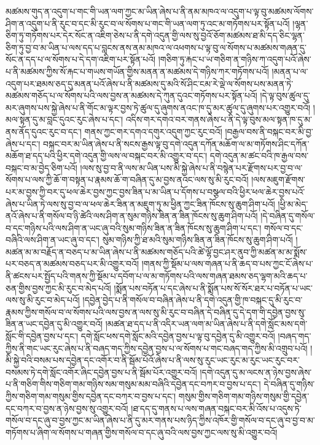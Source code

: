མཚམས་གུད་ན་འདུག་པ་གང་གི་ཡན་ལག་ཀྱང་མ་ཡིན་ཞེས་པ་ནི་ནམ་མཁའ་ལ་འདུག་པ་ལྟ་བུ་མཚམས་ལོགས་ཤིག་ན་འདུག་པ་ནི་རུང་བ་དང་མི་རུང་བ་ལ་སོགས་པ་གང་གི་ཡན་ལག་ཏུ་འང་མ་གཏོགས་པར་སྟོན་པའོ། །ལྷན་ཅིག་ཏུ་གཏོགས་པར་དེར་སོང་ན་འཇིག་ཅེས་པ་ནི་དགེ་འདུན་གྱི་ལས་སུ་བྱའོ་ཅོག་མཚམས་ཐ་མི་དད་ཅིང་ལྷན་ཅིག་ཏུ་བྱ་བ་མ་ཡིན་པ་ལས་དད་པ་བླངས་ནས་ནམ་མཁའ་ལ་འཕགས་པ་ལྟ་བུ་ལ་སོགས་པ་མཚམས་གཞན་དུ་སོང་ན་དད་པ་ལ་སོགས་པ་དེ་དག་འཇིག་པར་སྟོན་པའོ། །གཅིག་ཏུ་རྐང་པ་ཡ་གཅིག་ན་གཉིས་ཀ་འདུག་པའོ་ཞེས་པ་ནི་མཚམས་ཀྱིས་སོ་རྐང་པ་གཡས་གཡོན་གྱིས་མནན་ན་མཚམས་དེ་གཉིས་ཀར་གཏོགས་པའོ། །མནན་པ་ལ་འདུག་པར་ཐམས་ཅད་དུ་མནན་པའོ་ཞེས་པ་ནི་མཚམས་དུ་མའི་སོ་ཤིང་ངམ་རེ་ལྡེ་ལ་སོགས་པས་མནན་ཏེ་མཚམས་གཅོད་པ་ལ་སོགས་པའི་ལས་བྱས་ན་མཚམས་དེ་ཀུན་དུའང་གཏོགས་པར་སྟོན་པའོ། །དེ་ལྟ་བུས་ཚུལ་དུ་མར་ཞུགས་པས་སྐྱེ་ཞེས་པ་ནི་གོང་མ་ལྟར་བྱས་ཏེ་ཚུལ་དུ་ཞུགས་ནའང་ཁ་དུ་མར་ཚུལ་དུ་ཞུགས་པར་འགྱུར་བའོ། །མལ་སྟན་དུ་མ་བླང་དུའང་རུང་ཞེས་པ་དང་། འདིས་གར་དགའ་བར་གནས་ཞེས་པ་ནི་དེ་ལྟ་བུས་མལ་སྟན་ཁ་དུ་མ་ནས་ནོད་དུའང་རུང་བ་དང་། གནས་ཀྱང་གར་དགའ་དགུར་འདུག་ཀྱང་རུང་བའོ། །བརྒྱལ་བས་ནི་བསྐང་བར་མི་བྱ་ཞེས་པ་དང་། བསྐང་བར་མ་ཡིན་ཞེས་པ་ནི་སངས་རྒྱས་ལྟ་བུ་དགེ་འདུན་དཀོན་མཆོག་ལ་མ་གཏོགས་ཤིང་དཀོན་མཆོག་ཐ་དད་པའི་ཕྱིར་དགེ་འདུན་གྱི་ལས་ལ་བསྐང་བར་མི་འགྱུར་བ་དང་། དགེ་འདུན་མ་ཚང་བའི་ཁ་རྒྱལ་བས་བསྐང་བ་མ་བྱེད་ཅིག་པའོ། །ལས་སུ་བྱ་བ་ནི་ལས་མ་ཡིན་པས་མི་སྐྱེ་ཞེས་པ་ནི་བསྙེན་པར་རྫོགས་པར་བྱ་བ་ལ་སོགས་པ་ལས་ཀྱི་ཆོ་ག་བསྟན་པ་རྣམས་ཆོ་ག་བཞིན་དུ་མ་བྱས་ནའང་ལས་སུ་མི་རུང་བའོ། །ལས་མཇུག་རྫོགས་པར་མ་བྱས་ཀྱི་བར་དུ་ཕལ་ཆེར་བྱས་ཀྱང་བྱས་ཟིན་པ་མ་ཡིན་པ་དོགས་པ་བསྩལ་བའི་ཕྱིར་ཕལ་ཆེར་བྱས་པའོ་ཞེས་པ་ཡིན་ཏེ་ལས་སུ་བྱ་བ་ལ་ཕལ་ཆེར་ཟིན་ན་མཇུག་ཏུ་མ་ཕྱིན་ཀྱང་ཟིན་ཁོངས་སུ་ཆུག་ཤིག་པའོ། །ཕྱི་མ་མེད་ནའོ་ཞེས་པ་ནི་གསོལ་བ་ཉི་ཚེའི་ལས་ཤིག་ན་སུམ་གཉིས་ཟིན་ན་ཟིན་ཁོངས་སུ་ཆུག་ཤིག་པའོ། །དེ་བཞིན་དུ་གསོལ་བ་དང་གཉིས་པའི་ལས་ཤིག་ན་ཡང་ཞུ་བའི་སུམ་གཉིས་ཟིན་ན་ཟིན་ཁོངས་སུ་ཆུག་ཤིག་པ་དང་། གསོལ་བ་དང་བཞིའི་ལས་ཤིག་ན་ཡང་ཞུ་བ་དང་། སུམ་གཉིས་ཀྱི་ཐ་མའི་སུམ་གཉིས་ཟིན་ན་ཟིན་ཁོངས་སུ་ཆུག་ཤིག་པའོ། །མཚན་མ་མ་བརྗོད་ན་བཅད་པ་མ་ཡིན་ཞེས་པ་ནི་མཚམས་གཅོད་པའི་ཚེ་ལྷོ་བྱང་ཤར་ནུབ་ཀྱི་མཚན་མ་མ་སྨོས་པར་བཅད་ན་མཚམས་བཅད་པར་མི་འགྱུར་བའོ། །གནས་ཀྱི་སྡོམ་པ་ལས་གཞན་པ་ནི་ཆད་བ་པས་ཀྱང་ངོ་ཞེས་པ་ནི་ཚངས་པར་སྤྱོད་པའི་གནས་ཀྱི་སྡོམ་པ་དབོག་པ་ལ་མ་གཏོགས་པའི་ལས་གཞན་ཐམས་ཅད་ལྷག་མའི་ཆད་པ་ཅན་གྱིས་བྱས་ཀྱང་མི་རུང་བ་མེད་པའོ། །སྨོན་པས་བཏོན་པ་དང་ཞེས་པ་ནི་སྨོན་པས་སོ་སོར་ཐར་པ་བཏོན་པ་ཡང་ལས་སུ་མི་རུང་བ་མེད་པའོ། །དབྱེན་བྱེད་པ་ནི་གསོལ་བ་བཞིན་ཞེས་པ་ནི་དགེ་འདུན་གྱི་ཁ་བསྐང་དུ་མི་རུང་བ་རྣམས་ཀྱིས་གསོལ་བ་ལ་སོགས་པའི་ལས་བྱས་ན་ལས་སུ་མི་རུང་བ་བཞིན་དེ་བཞིན་དུ་དེ་དག་གི་དབྱེན་བྱས་སུ་ཟིན་ན་ཡང་དབྱེན་དུ་མི་འགྱུར་བའོ། །མཚན་ཐ་དད་པ་ནི་འདིར་ཡན་ལག་མ་ཡིན་ཞེས་པ་ནི་དགེ་སློང་མས་དགེ་སློང་གི་དབྱེན་བྱས་པ་དང་། དགེ་སློང་ཕས་དགེ་སློང་མའི་དབྱེན་བྱས་པ་ལྟ་བུ་དབྱེན་དུ་མི་འགྱུར་བའོ། །བཞད་གད་ཀྱིས་ནི་གང་ཡང་རུང་ཞེས་པ་ནི་བཞད་གད་ཀྱིས་དབྱེན་བྱས་པ་ལ་སོགས་པ་གང་བཞད་གད་ཀྱིས་མི་འགྲུབ་པའོ། །མི་སྐྱེ་བའི་བསམ་པས་དབྱེན་དང་འགོར་བ་ནི་སྦོམ་པོའོ་ཞེས་པ་ནི་ལས་སུ་རུང་ཡང་རུང་མ་རུང་ཡང་རུང་བར་བསམས་ཏེ་དགེ་སློང་འགོར་ཞིང་དབྱེན་བྱས་པ་ནི་སྦོམ་པོར་འགྱུར་བའོ། །དགེ་འདུན་དུ་མ་ལངས་ན་ཉེས་བྱས་ཞེས་པ་ནི་གཅིག་གིས་གཅིག་གམ་གཉིས་སམ་གསུམ་མམ་བཞིའི་དབྱེན་དང་བཀར་བ་བྱས་པ་དང་། དེ་བཞིན་དུ་གཉིས་ཀྱིས་གཅིག་གམ་གསུམ་གྱིས་དབྱེན་དང་བཀར་བ་བྱས་པ་དང་། གསུམ་གྱིས་གཅིག་གམ་གཉིས་གསུམ་གྱི་དབྱེན་དང་བཀར་བ་བྱས་ན་ཉེས་བྱས་སུ་འགྱུར་བའོ། །ཐ་དད་དུ་གནས་པ་ལས་གཞན་བསྐང་བར་མི་འོས་པ་འདུས་ཏེ་གསོལ་བ་དང་ཞུ་བ་བྱས་ཀྱང་མ་ཡིན་ཞེས་པ་ནི་དུ་མར་གནས་པས་ཉིད་ཀྱིས་འཁོར་གྱི་གསོལ་བ་དང་ཞུ་བ་བྱ་བ་མ་གཏོགས་པ་ཞིག་ལ་སོགས་པ་གཞན་གྱིས་གསོལ་བ་དང་ཞུ་བའི་ལས་བྱས་ཀྱང་ལས་སུ་མི་འགྱུར་བའོ། 